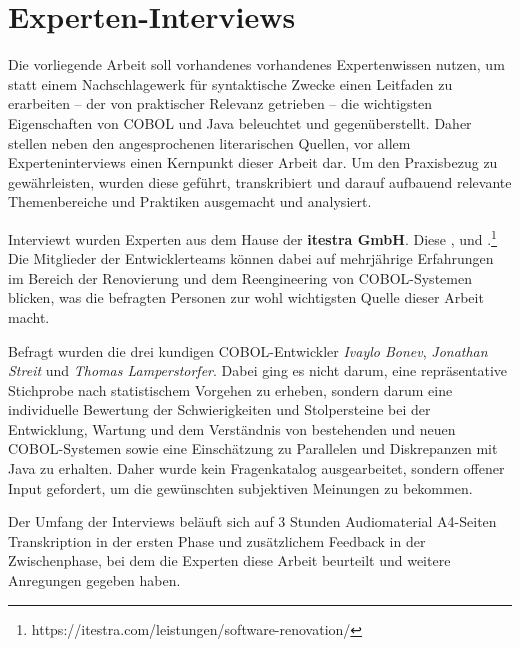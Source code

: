 \section{Experten-Interviews}\label{interviews}
Die vorliegende Arbeit soll vorhandenes vorhandenes Expertenwissen nutzen, um statt einem Nachschlagewerk für syntaktische Zwecke einen Leitfaden zu erarbeiten -- der von praktischer Relevanz getrieben -- die wichtigsten Eigenschaften von COBOL und Java beleuchtet und gegenüberstellt. Daher stellen neben den angesprochenen literarischen Quellen, vor allem Experteninterviews einen Kernpunkt dieser Arbeit dar. Um den Praxisbezug zu gewährleisten, wurden diese geführt, transkribiert und darauf aufbauend relevante Themenbereiche und Praktiken ausgemacht und analysiert.

Interviewt wurden Experten aus dem Hause der \textbf{itestra GmbH}. Diese ,  und .\footnote{\label{itestraFootnote}https://itestra.com/leistungen/software-renovation/} Die Mitglieder der Entwicklerteams können dabei auf mehrjährige Erfahrungen im Bereich der Renovierung und dem Reengineering von COBOL-Systemen blicken, was die befragten Personen zur wohl wichtigsten Quelle dieser Arbeit macht.

Befragt wurden die drei kundigen COBOL-Entwickler \textit{Ivaylo Bonev}, \textit{Jonathan Streit} und \textit{Thomas Lamperstorfer}. Dabei ging es nicht darum, eine repräsentative Stichprobe nach statistischem Vorgehen zu erheben, sondern darum eine individuelle Bewertung der Schwierigkeiten und Stolpersteine bei der Entwicklung, Wartung und dem Verständnis von bestehenden und neuen COBOL-Systemen sowie eine Einschätzung zu Parallelen und Diskrepanzen mit Java zu erhalten. Daher wurde kein Fragenkatalog ausgearbeitet, sondern offener Input gefordert, um die gewünschten subjektiven Meinungen zu bekommen. 

Der Umfang der Interviews beläuft sich auf 3 Stunden Audiomaterial  A4-Seiten Transkription in der ersten Phase und zusätzlichem Feedback in der Zwischenphase, bei dem die Experten diese Arbeit beurteilt und weitere Anregungen gegeben haben.
